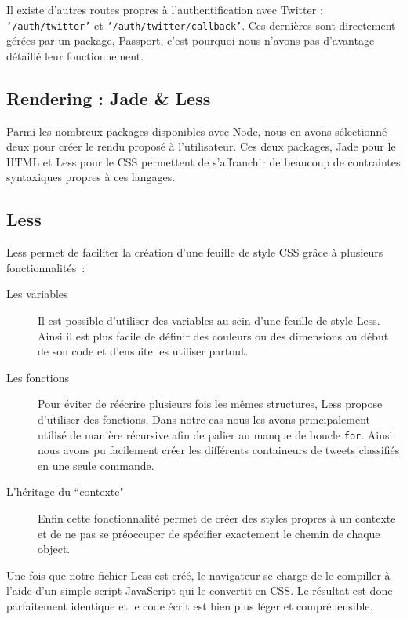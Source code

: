 \documentclass[a4paper]{article}
\begin{document}
Il existe d'autres routes propres à l'authentification avec Twitter : \texttt{`/auth/twitter'} et \texttt{`/auth/twitter/callback'}. Ces dernières sont directement gérées par un package, Passport, c'est pourquoi nous n'avons pas d'avantage détaillé leur fonctionnement.


\subsection{Rendering : Jade \& Less}
Parmi les nombreux packages disponibles avec Node, nous en avons sélectionné deux pour créer le rendu proposé à l'utilisateur. Ces deux packages, Jade pour le HTML et Less pour le CSS permettent de s'affranchir de beaucoup de contraintes syntaxiques propres à ces langages. 

\subsection{Less}
Less permet de faciliter la création d'une feuille de style CSS grâce à plusieurs fonctionnalités~: 
\begin{description}
 	\item[Les variables] Il est possible d'utiliser des variables au sein d'une feuille de style Less. Ainsi il est plus facile de définir des couleurs ou des dimensions au début de son code et d'ensuite les utiliser partout.
 	\item[Les fonctions] Pour éviter de réécrire plusieurs fois les mêmes structures, Less propose d'utiliser des fonctions. Dans notre cas nous les avons principalement utilisé de manière récursive afin de palier au manque de boucle \texttt{for}. Ainsi nous avons pu facilement créer les différents containeurs de tweets classifiés en une seule commande. 
 	\item[L'héritage du ``contexte"] Enfin cette fonctionnalité permet de créer des styles propres à un contexte et de ne pas se préoccuper de spécifier exactement le chemin de chaque object. 

 \end{description} 
Une fois que notre fichier Less est créé, le navigateur se charge de le compiller à l'aide d'un simple script JavaScript qui le convertit en CSS. Le résultat est donc parfaitement identique et le code écrit est bien plus léger et compréhensible.
\end{document}
